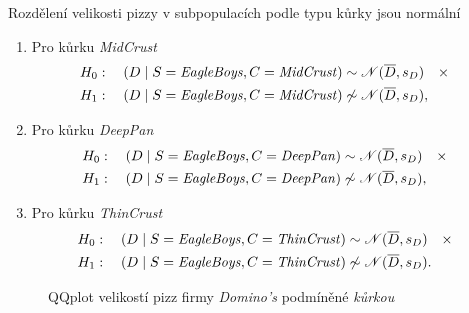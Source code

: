 \documentclass[czech]{article}
\newcommand\against{\ensuremath{\quad\times\quad}}
\begin{document}
\begin{hypothesis}
	\label{hyp:normalita_rozdeleni_velikosti_pizz_pro_firmu_eagle_boys_v_subpopulacich_podle_typu_kurky}
	Rozdělení velikosti pizzy v subpopulacích podle typu kůrky jsou normální
	\begin{enumerate}[label=(\alph*)]
		\item Pro kůrku \emph{MidCrust}
		      \label{hyp:normalita_rozdeleni_velikosti_pizz_pro_firmu_eagle_boys_v_subpopulacich_podle_typu_kurky_a}
		      \[
			      \begin{split}
				      &H_0: \quad (D \mid S = \text{\emph{EagleBoys}}, C = \text{\emph{MidCrust}}) \sim
				      \mathscr{N}(\overline{D}, s_D) \against \\
				      &H_1: \quad (D \mid S =
				      \text{\emph{EagleBoys}}, C = \text{\emph{MidCrust}}) \not\sim
				      \mathscr{N}(\overline{D}, s_D),
			      \end{split}
		      \]
		\item Pro kůrku \emph{DeepPan}
		      \label{hyp:normalita_rozdeleni_velikosti_pizz_pro_firmu_eagle_boys_v_subpopulacich_podle_typu_kurky_b}
		      \[
			      \begin{split}
				      &H_0: \quad (D \mid S = \text{\emph{EagleBoys}}, C = \text{\emph{DeepPan}}) \sim
				      \mathscr{N}(\overline{D}, s_D) \against \\
				      &H_1: \quad (D \mid S =
				      \text{\emph{EagleBoys}}, C = \text{\emph{DeepPan}}) \not\sim \mathscr{N}(\overline{D},
				      s_D),
			      \end{split}
		      \]
		\item Pro kůrku \emph{ThinCrust}
		      \label{hyp:normalita_rozdeleni_velikosti_pizz_pro_firmu_eagle_boys_v_subpopulacich_podle_typu_kurky_c}
		      \[
			      \begin{split}
				      &H_0: \quad (D \mid S = \text{\emph{EagleBoys}}, C = \text{\emph{ThinCrust}}) \sim
				      \mathscr{N}(\overline{D}, s_D) \against \\
				      &H_1: \quad (D \mid S =
				      \text{\emph{EagleBoys}}, C = \text{\emph{ThinCrust}}) \not\sim
				      \mathscr{N}(\overline{D}, s_D).
			      \end{split}
		      \]
	\end{enumerate}
\end{hypothesis}

\begin{figure}[H]
	\centering
	\label{fig:qqplots_crusts_dominos}
	
	\caption{QQplot velikostí pizz firmy \emph{Domino's} podmíněné \emph{kůrkou}}
\end{figure}
\end{document}
